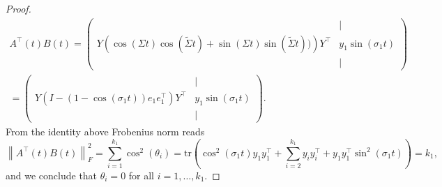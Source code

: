 \documentclass[10pt,a4paper]{amsart}
\begin{document}
\begin{proof}
\begin{multline}
	A^\top(t) B(t) = 	
	\begin{pmatrix}
		& | \\
		Y\left( \cos\left(\Sigma t\right) \cos\left(\widetilde{\Sigma} t\right) + \sin\left(\Sigma t\right) \sin\left(\widetilde{\Sigma} t\right))\right)Y^\top & y_1 \sin(\sigma_1 t)\\
		&|
	\end{pmatrix} \\= 
	\begin{pmatrix}
		& | \\
		Y\left(I - (1 - \cos(\sigma_1 t))e_1 e_1^\top\right)Y^\top & y_1 \sin(\sigma_1 t)\\
		&|
	\end{pmatrix}.
\end{multline}
From the identity above Frobenius norm reads
\begin{equation}
	\left\|A^\top(t) B(t)\right\|_{F}^2 = \sum_{i=1}^{k_1}\cos^2(\theta_i) = \text{tr}\left(\cos^2(\sigma_1 t) y_1 y_1^\top + \sum_{i=2}^{k_1} y_{i} y_{i}^{\top} + y_1 y_1^\top \sin^2(\sigma_1 t)\right) = k_1,
\end{equation}
and we conclude that $\theta_i = 0$ for all $i=1,\dots, k_1$. 
\end{proof}
\end{document}
